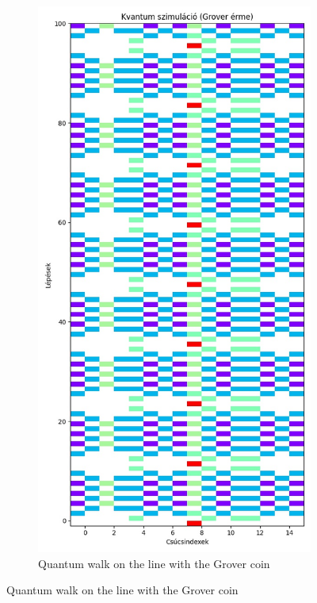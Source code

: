 \begin{figure}[H]
  \centering
  \begin{subfigure}{.45\linewidth}
    \centering
    \includegraphics[width=\linewidth]{./figures/results/grid/grover.jpg}
    \caption{Quantum walk on the line with the Grover coin}

\end{subfigure}
\end{figure}
